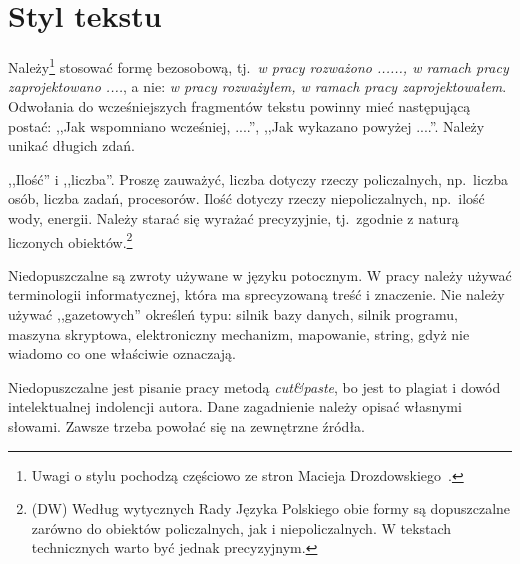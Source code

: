 \section*{Styl tekstu}

Należy\footnote{Uwagi o stylu pochodzą częściowo ze stron Macieja Drozdowskiego~\cite{mdro}.} 
stosować formę bezosobową, tj.~\emph{w pracy rozważono ......, 
w ramach pracy zaprojektowano ....}, a nie: \emph{w pracy rozważyłem, w ramach pracy zaprojektowałem}. 
Odwołania do wcześniejszych fragmentów tekstu powinny mieć następującą postać: ,,Jak wspomniano wcześniej, ....'', 
,,Jak wykazano powyżej ....''. Należy unikać długich zdań. 

,,Ilość'' i ,,liczba''. Proszę zauważyć, liczba dotyczy rzeczy policzalnych, np.~liczba osób, liczba zadań, procesorów. 
Ilość dotyczy rzeczy niepoliczalnych, np.~ilość wody, energii. Należy starać się wyrażać precyzyjnie, tj.~zgodnie 
z naturą liczonych obiektów.\footnote{(DW) Według wytycznych Rady Języka Polskiego obie formy są dopuszczalne
zarówno do obiektów policzalnych, jak i niepoliczalnych. W tekstach technicznych warto być jednak precyzyjnym.}

Niedopuszczalne są zwroty używane w języku potocznym. W pracy należy używać terminologii informatycznej, która ma 
sprecyzowaną treść i znaczenie. Nie należy używać ,,gazetowych'' określeń typu: 
silnik bazy danych, silnik programu, maszyna skryptowa, elektroniczny mechanizm, mapowanie, string, gdyż nie wiadomo 
co one właściwie oznaczają. 

Niedopuszczalne jest pisanie pracy metodą \emph{cut\&paste}, bo jest to plagiat i dowód intelektualnej indolencji autora.
Dane zagadnienie należy opisać własnymi słowami. Zawsze trzeba powołać się na zewnętrzne źródła. 

